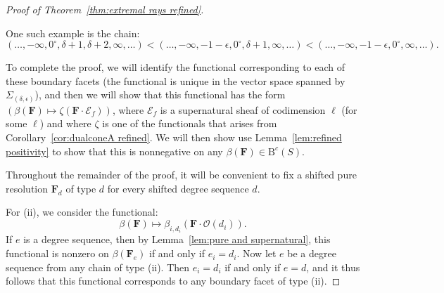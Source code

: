 \documentclass[12pt]{amsart}
\theoremstyle{definition}
\theoremstyle{remark}
\newcommand{\cc}{c}
\newcommand{\dd}{d}
\newcommand{\cO}{\mathcal{O}}
\newcommand{\cE}{\mathcal{E}}
\newcommand{\FF}{\mathbf{F}}
\newcommand{\zp}{\circ}
\newcommand{\BBQ}{\mathrm{B}}
\begin{document}
\begin{proof}[Proof of Theorem~\ref{thm:extremal rays refined}]
\begin{enumerate}[(i)]
%
One such example is the chain:
\[
(\dots,-\infty,0^\zp,\delta+1,\delta+2,\infty,\dots)<(\dots,-\infty,-1-\epsilon,0^\zp,\delta+1,\infty,\dots)<(\dots,-\infty,-1-\epsilon,0^\zp,\infty,\dots).
\]
\end{enumerate} 

To complete the proof, we will identify the functional corresponding to each of these boundary facets (the functional is unique in the vector space spanned by $\Sigma_{(\delta,\epsilon)}$), and then we will show that this functional has the form $(\beta(\FF)\mapsto \zeta(\FF\cdot \cE_f))$, where $\cE_f$ is a supernatural sheaf of codimension $\ell$ (for some $\ell$) and where $\zeta$ is one of the functionals that arises from Corollary~\ref{cor:dualconeA refined}.   We will then show use Lemma~\ref{lem:refined positivity} to show that this is nonnegative on any $\beta(\FF)\in \BBQ^{\cc}(S)$.


Throughout the remainder of the proof, it will be convenient to fix a shifted pure resolution $\FF_{\dd}$ of type $\dd$ for every shifted degree sequence $\dd$.


For (ii), we consider the functional:
\[
\beta(\FF)\mapsto \beta_{i,{d_i}}(\FF\cdot \cO(d_i)).
\]
If $e$ is a degree sequence, then by Lemma~\ref{lem:pure and supernatural}, this functional is nonzero on $\beta(\FF_e)$ if and only if $e_i=d_i$.
Now let $e$ be a degree sequence from any chain of type (ii).  Then $e_i=d_i$ if and only if $e=d$, and it thus follows that this functional corresponds to any boundary facet of type (ii).


\end{proof}
\end{document}
